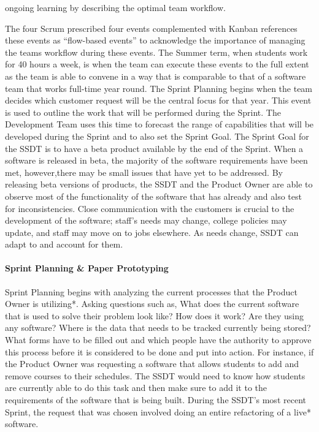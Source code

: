 ongoing learning by describing the optimal team workflow.

The four Scrum prescribed four events complemented with Kanban references these events as ``flow-based events'' to acknowledge the importance of managing the teams workflow during these events. The Summer term, when students work for 40 hours a week, is when the team can execute these events to the full extent as the team is able to convene in a way that is comparable to that of a software team that works full-time year round. The Sprint Planning begins when the team decides which customer request will be the central focus for that year. This event is used to outline the work that will be performed during the Sprint. The Development Team uses this time to forecast the range of capabilities that will be developed during the Sprint and to also set the Sprint Goal. The Sprint Goal for the SSDT is to have a beta product available by the end of the Sprint.  When a software is released in beta, the majority of the software requirements have been met, however,there may be small issues that have yet to be addressed.  By releasing beta versions of products, the SSDT and the Product Owner are able to observe most of the functionality of the software that has already and also test for inconsistencies. Close communication with the customers is crucial to the development of the software; staff's needs may change, college policies may update, and staff may move on to jobs elsewhere. As needs change, SSDT can adapt to and account for them.



\paragraph{Sprint Planning & Paper Prototyping}
Sprint Planning begins with analyzing the current processes that the Product Owner is utilizing*. Asking questions such as, What does the current software that is used to solve their problem look like? How does it work? Are they using any software? Where is the data that needs to be tracked currently being stored? What forms have to be filled out and which people have the authority to approve this process before it is considered to be done and put into action. For instance, if the Product Owner was requesting a software that allows students to add and remove courses to their schedules. The SSDT would need to know how students are currently able to do this task and then make sure to add it to the requirements of the software that is being built. During the SSDT's most recent Sprint, the request that was chosen involved doing an entire refactoring of a live* software.

